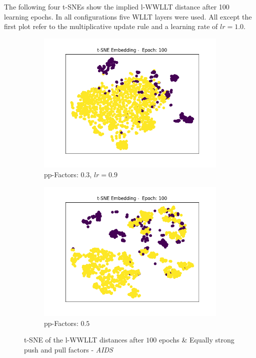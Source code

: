 		The following four t-SNEs show the implied l-WWLLT distance after 100 learning epochs.
		In all configurations five WLLT layers were used.
		All except the first plot refer to the multiplicative update rule and a learning rate of $lr=1.0$.
		
		\begin{figure}[H]
			\centering
			\begin{subfigure}{0.49\textwidth}
				\centering
				\includegraphics[width=1.1\linewidth]{images/plotA4_tSNE_e100_AIDS_E_GDL_18_23h-43m} %
				\caption{pp-Factors: $0.3$, $lr=0.9$}
				\label{fig:plota4tsnee100aidsegdl1823h-43m}
			\end{subfigure}
			\begin{subfigure}{0.49\textwidth}
				\centering
				\includegraphics[width=1.1\linewidth]{images/plotA4_tSNE_e100_AIDS_E_GDL_24_17h-05m}  %
				\caption{pp-Factors: $0.5$}
				\label{fig:plota4tsnee100aidsegdl2417h-05m}
			\end{subfigure}
			\caption{t-SNE of the l-WWLLT distances after $100$ epochs \& Equally strong push and pull factors - \textit{AIDS}}
			\label{fig:tSNE_100_A}
		\end{figure}
		

